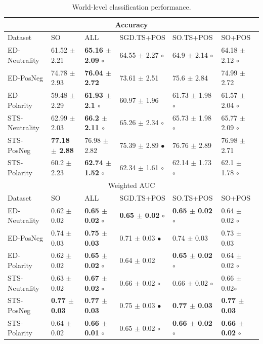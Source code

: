 \documentclass{sig-alternate}
\begin{document}
\begin{table}[!htb]
\begin{center}
\begin{tabular}{l|l|l|l|l|l}
\hline \hline
\multicolumn{ 6}{c}{Accuracy } \\ \hline \hline
Dataset & SO & ALL & SGD.TS+POS & SO.TS+POS & SO+POS \\ \hline
ED-Neutrality & 61.52 $\pm$ 2.21 & \textbf{65.16 $\pm$ 2.09} $\circ$ & 64.55 $\pm$ 2.27 $\circ$ & 64.9 $\pm$ 2.14  $\circ$ & 64.18 $\pm$ 2.12 $\circ$ \\ 
ED-PosNeg & 74.78 $\pm$ 2.93 & \textbf{76.04 $\pm$ 2.72} & 73.61 $\pm$ 2.51 & 75.6 $\pm$ 2.84 & 74.99 $\pm$ 2.72 \\ 
ED-Polarity & 59.48 $\pm$ 2.29 & \textbf{61.93 $\pm$ 2.1 $\circ$} & 60.97 $\pm$ 1.96 & 61.73 $\pm$ 1.98 $\circ$ & 61.57 $\pm$ 2.04 $\circ$ \\  \hline
STS-Neutrality & 62.99 $\pm$ 2.03 & \textbf{66.2 $\pm$ 2.11 $\circ$} & 65.26 $\pm$ 2.34 $\circ$ & 65.73 $\pm$ 1.98 $\circ$ & 65.77 $\pm$ 2.09 $\circ$ \\ 
STS-PosNeg & \textbf{77.18 $\pm$ 2.88} & 76.98 $\pm$ 2.82 & 75.39 $\pm$ 2.89 $\bullet$ & 76.76 $\pm$ 2.89 & 76.98 $\pm$ 2.71 \\ 
STS-Polarity & 60.2 $\pm$ 2.23 & \textbf{62.74 $\pm$ 1.52} $\circ$ & 62.34 $\pm$ 1.61 $\circ$ & 62.14 $\pm$ 1.73 $\circ$ & 62.1 $\pm$ 1.78 $\circ$ \\  \hline \hline
\multicolumn{ 6}{c}{Weighted AUC } \\ \hline \hline
Dataset & SO & ALL & SGD.TS+POS & SO.TS+POS & SO+POS \\ \hline
ED-Neutrality & 0.62 $\pm$ 0.02 &  \textbf{0.65 $\pm$ 0.02} $\circ$ & \textbf{0.65 $\pm$ 0.02} $\circ$  & \textbf{0.65 $\pm$ 0.02} $\circ$ & 0.64 $\pm$ 0.02 $\circ$ \\ 
ED-PosNeg & 0.74 $\pm$ 0.03 & \textbf{0.75 $\pm$ 0.03} & 0.71 $\pm$ 0.03 $\bullet$ & 0.74 $\pm$ 0.03 & 0.73 $\pm$ 0.03 \\ 
ED-Polarity & 0.62 $\pm$ 0.02 &  \textbf{0.65 $\pm$0.02} $\circ$ & 0.64 $\pm$ 0.02 & \textbf{0.65 $\pm$ 0.02} $\circ$ & 0.64 $\pm$ 0.02 $\circ$ \\ \hline
STS-Neutrality & 0.63 $\pm$ 0.02 & \textbf{0.67 $\pm$ 0.02} $\circ$             & 0.66 $\pm$ 0.02 $\circ$  & 0.66 $\pm$ 0.02 $\circ$ & 0.66 $\pm$ 0.02$\circ$ \\ 
STS-PosNeg & \textbf{0.77 $\pm$ 0.03} &  \textbf{0.77 $\pm$ 0.03} & 0.75 $\pm$ 0.03 $\bullet$ & \textbf{0.77 $\pm$ 0.03} & \textbf{0.77 $\pm$ 0.03} \\ 
STS-Polarity & 0.64 $\pm$ 0.02 & \textbf{0.66 $\pm$ 0.01} $\circ$  & 0.65 $\pm$ 0.02 $\circ$  & \textbf{0.66 $\pm$ 0.02} $\circ$ & \textbf{0.66 $\pm$ 0.02} $\circ$ \\ \hline 
\end{tabular}
\end{center}
\caption{World-level classification performance.} 
\label{tab:classres}
\end{table}
\end{document}
